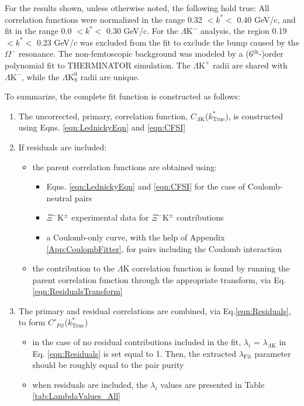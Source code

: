 \documentclass[ALICE,manyauthors]{cernphprep}
\newcommand{\ktrue}{$k^{*}_{\mathrm{True}}$\xspace}
\newcommand{\LamK}{$\Lambda$K\xspace}
\newcommand{\LamKchP}{$\Lambda\mathrm{K^{+}}$\xspace}
\newcommand{\LamKchM}{$\Lambda\mathrm{K^{-}}$\xspace}
\newcommand{\LamKs}{$\Lambda\mathrm{K^{0}_{S}}$\xspace}
\newcommand{\XiKpm}{$\Xi^{-}\mathrm{K^{\pm}}$\xspace}
\begin{document}
For the results shown, unless otherwise noted, the following hold true:
All correlation functions were normalized in the range 0.32 $< k^{*} <$ 0.40 GeV/c, and fit in the range 0.0 $< k^{*} <$ 0.30 GeV/c.
For the \LamKchM analysis, the region 0.19 $< k^{*} <$ 0.23 GeV/$c$ was excluded from the fit to exclude the bump caused by the $\Omega^{-}$ resonance.
The non-femtoscopic background was modeled by a (6$^{\mathrm{th}}$-)order polynomial fit to THERMINATOR simulation.
The \LamKchP radii are shared with \LamKchM, while the \LamKs radii are unique.


To summarize, the complete fit function is constructed as follows:

\begin{enumerate}
 \item The uncorrected, primary, correlation function, $C_{\Lambda\mathrm{K}}$(\ktrue), is constructed using Eqns. \ref{eqn:LednickyEqn} and \ref{eqn:CFSI}
 \item If residuals are included:
 \begin{itemize}
  \item the parent correlation functions are obtained using:
  \begin{itemize}
   \item Eqns. \ref{eqn:LednickyEqn} and \ref{eqn:CFSI} for the case of Coulomb-neutral pairs
   \item \XiKpm experimental data for \XiKpm contributions
   \item a Coulomb-only curve, with the help of Appendix \ref{App:CoulombFitter}, for pairs including the Coulomb interaction 
  \end{itemize} 
 \item the contribution to the \LamK correlation function is found by running the parent correlation function through the appropriate transform, via Eq.\ref{eqn:ResidualsTransform} 
 \end{itemize} 
 \item The primary and residual correlations are combined, via Eq.\ref{eqn:Residuals}, to form $C'_{Fit}$(\ktrue)
 \begin{itemize}
  \item in the case of no residual contributions included in the fit, $\lambda_{i}$ = $\lambda_{\Lambda\mathrm{K}}$ in Eq. \ref{eqn:Residuals} is set equal to 1.  Then, the extracted $\lambda_{\mathrm{Fit}}$ parameter should be roughly equal to the pair purity
  \item when residuals are included, the $\lambda_{i}$ values are presented in Table \ref{tab:LambdaValues_All}

\end{itemize}
\end{enumerate}
\end{document}
